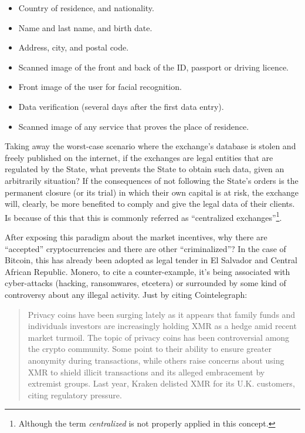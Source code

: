 \documentclass[12pt,a4paper]{article}
\begin{document}
\begin{itemize}
\item Country of residence, and nationality.
\item Name and last name, and birth date.
\item Address, city, and postal code.
\item Scanned image of the front and back of the ID, passport or driving licence.
\item Front image of the user for facial recognition.
\item Data verification (several days after the first data entry).
\item Scanned image of any service that proves the place of residence.
\end{itemize}

Taking away the worst-case scenario where the exchange's database is stolen and freely published on the internet, if the exchanges are legal entities that are regulated by the State, what prevents the State to obtain such data, given an arbitrarily situation? If the consequences of not following the State's orders is the permanent closure (or its trial) in which their own capital is at risk, the exchange will, clearly, be more benefited to comply and give the legal data of their clients. Is because of this that this is commonly referred as “centralized exchanges”\footnote{Although the term \textit{centralized} is not properly applied in this concept.}.

After exposing this paradigm about the market incentives, why there are “accepted” cryptocurrencies and there are other “criminalized”? In the case of Bitcoin, this has already been adopted as legal tender in El Salvador and Central African Republic. Monero, to cite a counter-example, it's being associated with cyber-attacks (hacking, ransomwares, etcetera) or surrounded by some kind of controversy about any illegal activity. Just by citing Cointelegraph:

\begin{quotation}
Privacy coins have been surging lately as it appears that family funds and individuals investors are increasingly holding XMR as a hedge amid recent market turmoil. The topic of privacy coins has been controversial among the crypto community. Some point to their ability to ensure greater anonymity during transactions, while others raise concerns about using XMR to shield illicit transactions and its alleged embracement by extremist groups. Last year, Kraken delisted XMR for its U.K. customers, citing regulatory pressure.  \cite{cointelegraph}
\end{quotation}
\end{document}
